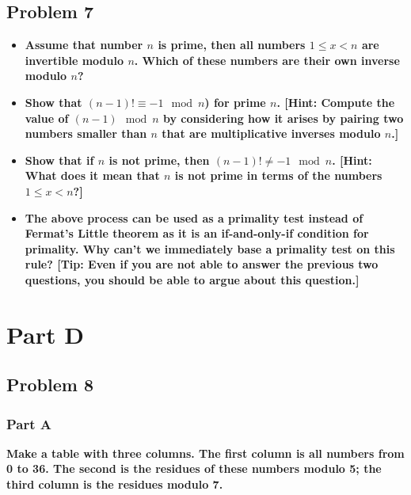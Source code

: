 \documentclass[11pt]{article}
\begin{document}
\subsection*{Problem 7}

\begin{itemize}

\item \textbf{Assume that number $n$ is prime, then all numbers $1 \leq x < n$
  are invertible modulo $n$. Which of these numbers are their own
  inverse modulo $n$?}

\item \textbf{Show that $(n-1)! \equiv -1 \mod n$) for prime $n$. [Hint:
  Compute the value of $(n-1) \mod n$ by considering how it arises by
  pairing two numbers smaller than $n$ that are multiplicative
  inverses modulo $n$.]}

\item \textbf{Show that if $n$ is not prime, then $(n-1)! \neq -1 \mod
  n$. [Hint: What does it mean that $n$ is not prime in terms of the
    numbers $1 \leq x < n$?]}

\item \textbf{The above process can be used as a primality test instead of
  Fermat's Little theorem as it is an if-and-only-if condition for
  primality. Why can't we immediately base a primality test on this
  rule? [Tip: Even if you are not able to answer the previous two
    questions, you should be able to argue about this question.]}

\end{itemize}

\section*{Part D}

\subsection*{Problem 8}

\subsubsection*{Part A} 

\textbf{Make a table with three columns. The first column is all numbers
from 0 to 36. The second is the residues of these numbers modulo 5;
the third column is the residues modulo 7.}
\end{document}
